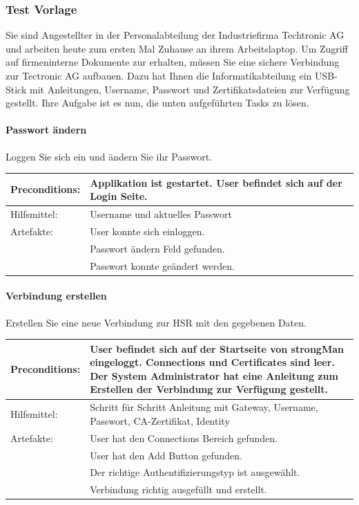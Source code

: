 \subsubsection{Test Vorlage}


Sie sind Angestellter in der Personalabteilung der Industriefirma Techtronic AG und arbeiten heute zum ersten Mal Zuhause an ihrem Arbeitslaptop. Um Zugriff auf firmeninterne Dokumente zur erhalten, müssen Sie eine sichere Verbindung zur Tectronic AG aufbauen. Dazu hat Ihnen die Informatikabteilung ein USB-Stick mit Anleitungen, Username, Passwort und Zertifikatsdateien zur Verfügung gestellt. Ihre Aufgabe ist es nun, die unten aufgeführten Tasks zu lösen.

\paragraph{Passwort ändern}
Loggen Sie sich ein und ändern Sie ihr Passwort. \\


\begin{tabular}{ | p{} | p{} | }
\hline
Preconditions: & Applikation ist gestartet. User befindet sich auf der Login Seite. \\
\hline
Hilfsmittel: & Username und aktuelles Passwort \\
\hline
Artefakte: & User konnte sich einloggen. \\ 
& Passwort ändern Feld gefunden. \\
& Passwort konnte geändert werden. \\
\hline
\end{tabular}

\paragraph{Verbindung erstellen}
Erstellen Sie eine neue Verbindung zur HSR mit den gegebenen Daten. \\


\begin{tabular}{ | p{} | p{} | }
\hline
Preconditions: & User befindet sich auf der Startseite von strongMan eingeloggt. Connections und Certificates sind leer. Der System Administrator hat eine Anleitung zum Erstellen der Verbindung zur Verfügung gestellt. \\
\hline
Hilfsmittel: & Schritt für Schritt Anleitung mit Gateway, Username, Passwort, CA-Zertifikat, Identity \\
\hline
Artefakte: & User hat den Connections Bereich gefunden. \\
& User hat den Add Button gefunden. \\
& Der richtige Authentifizierungstyp ist ausgewählt. \\
& Verbindung richtig ausgefüllt und erstellt. \\
\hline
\end{tabular}


